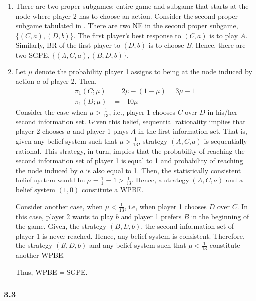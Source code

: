 \documentclass[]{article}
\begin{document}
\begin{enumerate}[label=(\roman*)]
	\item There are two proper subgames: entire game and subgame that starts at the node where player 2 has to choose an action. Consider the second proper subgame tabulated in .	There are two NE in the second proper subgame, $\{(C, a), (D, b)\}$. The first player's best response to $(C, a)$ is to play $A$. Similarly, BR of the first player to $(D, b)$ is to choose $B$. Hence, there are two SGPE, $\{(A, C, a), (B, D, b)\}$.
	
	\item 	Let $\mu$ denote the probability player 1 assigns to being at the node induced by action $a$ of player 2. Then, 
	\begin{equation}
		\begin{split}
			\pi_1(C; \mu)& = 2\mu - (1 - \mu) = 3\mu - 1 \\ \nonumber
			\pi_1(D; \mu)& = -10\mu
		\end{split}
	\end{equation}
	Consider the case when $\mu > \frac{1}{13}$, i.e., player 1 chooses $C$ over $D$ in his/her second information set. Given this belief, sequential rationality implies that player 2 chooses $a$ and player 1 plays $A$ in the first information set. That is, given any belief system such that $\mu > \frac{1}{13}$, strategy $(A, C, a)$ is sequentially rational. This strategy, in turn, implies that the probability of reaching the second information set of player 1 is equal to 1 and probability of reaching the node induced by $a$ is also equal to 1. Then, the statistically consistent belief system would be $\mu = \frac{1}{1} = 1 > \frac{1}{13}$. Hence, a strategy $(A, C, a)$ and a belief system $(1, 0)$ constitute a WPBE.
	
	Consider another case, when $\mu < \frac{1}{13}$, i.e, when player 1 chooses $D$ over $C$. In this case, player 2 wants to play $b$ and player 1 prefers $B$ in the beginning of the game. Given, the strategy $(B, D, b)$, the second information set of player 1 is never reached. Hence, any belief system is consistent. Therefore, the strategy $(B, D, b)$ and any belief system such that $\mu < \frac{1}{13}$ constitute another WPBE.
	
	Thus, WPBE = SGPE.
\end{enumerate}

\subsubsection*{3.3}
\end{document}
